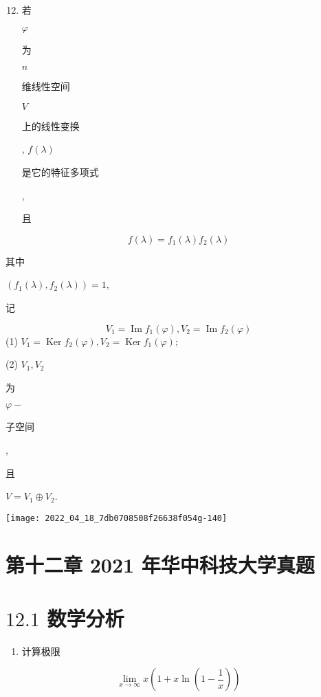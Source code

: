\documentclass[10pt]{article}
\begin{document}
\begin{enumerate}
  \setcounter{enumi}{11}
  \item \begin{CJK}{UTF8}{mj}若\end{CJK} $\varphi$ \begin{CJK}{UTF8}{mj}为\end{CJK} $n$ \begin{CJK}{UTF8}{mj}维线性空间\end{CJK} $V$ \begin{CJK}{UTF8}{mj}上的线性变换\end{CJK}, $f(\lambda)$ \begin{CJK}{UTF8}{mj}是它的特征多项式\end{CJK}, \begin{CJK}{UTF8}{mj}且\end{CJK}
\end{enumerate}
$$
f(\lambda)=f_{1}(\lambda) f_{2}(\lambda)
$$
\begin{CJK}{UTF8}{mj}其中\end{CJK} $\left(f_{1}(\lambda), f_{2}(\lambda)\right)=1$, \begin{CJK}{UTF8}{mj}记\end{CJK}
$$
V_{1}=\operatorname{Im} f_{1}(\varphi), V_{2}=\operatorname{Im} f_{2}(\varphi)
$$
(1) $V_{1}=\operatorname{Ker} f_{2}(\varphi), V_{2}=\operatorname{Ker} f_{1}(\varphi)$;

(2) $V_{1}, V_{2}$ \begin{CJK}{UTF8}{mj}为\end{CJK} $\varphi-$ \begin{CJK}{UTF8}{mj}子空间\end{CJK}, \begin{CJK}{UTF8}{mj}且\end{CJK} $V=V_{1} \oplus V_{2}$.

\texttt{[image: 2022\_04\_18\_7db0708508f26638f054g-140]}

\section{第十二章 2021 年华中科技大学真题}
\section{$12.1$ 数学分析}
\begin{enumerate}
  \item \begin{CJK}{UTF8}{mj}计算极限\end{CJK}
\end{enumerate}
$$
\lim _{x \rightarrow \infty} x\left(1+x \ln \left(1-\frac{1}{x}\right)\right)
$$
\end{document}
